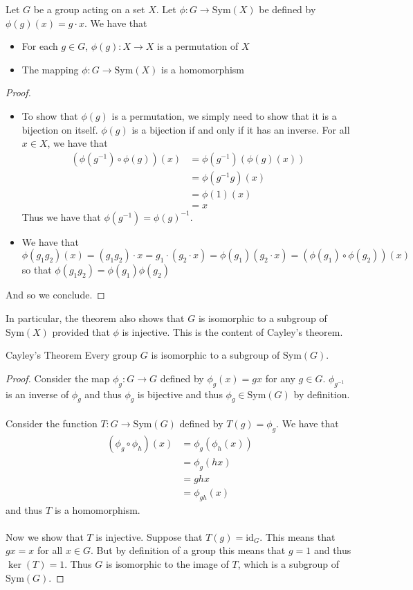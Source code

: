 \documentclass[a4paper]{article}
\begin{document}
\begin{prp}{}{} Let $G$ be a group acting on a set $X$. Let $\phi:G\to\text{Sym}(X)$ be defined by $\phi(g)(x)=g\cdot x$. We have that 
\begin{itemize}
\item For each $g\in G$, $\phi(g):X\to X$ is a permutation of $X$
\item The mapping $\phi:G\to\text{Sym}(X)$ is a homomorphism
\end{itemize}\tcbline
\begin{proof}~\\
\begin{itemize}
\item To show that $\phi(g)$ is a permutation, we simply need to show that it is a bijection on itself. $\phi(g)$ is a bijection if and only if it has an inverse. For all $x\in X$, we have that 
\begin{align*}
(\phi(g^{-1})\circ\phi(g))(x)&=\phi(g^{-1})(\phi(g)(x))\\
&=\phi(g^{-1}g)(x)\\
&=\phi(1)(x)\\
&=x
\end{align*} Thus we have that $\phi(g^{-1})=\phi(g)^{-1}$. 
\item We have that $$\phi(g_1g_2)(x)=(g_1g_2)\cdot x=g_1\cdot(g_2\cdot x)=\phi(g_1)(g_2\cdot x)=(\phi(g_1)\circ\phi(g_2))(x)$$ so that $\phi(g_1g_2)=\phi(g_1)\phi(g_2)$
\end{itemize}
And so we conclude. 
\end{proof}
\end{prp}

In particular, the theorem also shows that $G$ is isomorphic to a subgroup of $\text{Sym}(X)$ provided that $\phi$ is injective. This is the content of Cayley's theorem. 

\begin{thm}{Cayley's Theorem}{} Every group $G$ is isomorphic to a subgroup of $\text{Sym}(G)$. \tcbline
\begin{proof}
Consider the map $\phi_g:G\to G$ defined by $\phi_g(x)=gx$ for any $g\in G$. $\phi_{g^{-1}}$ is an inverse of $\phi_g$ and thus $\phi_g$ is bijective and thus $\phi_g\in\text{Sym}(G)$ by definition. \\~\\
Consider the function $T:G\to\text{Sym}(G)$ defined by $T(g)=\phi_g$. We have that 
\begin{align*}
(\phi_g\circ\phi_h)(x)&=\phi_g(\phi_h(x))\\
&=\phi_g(hx)\\
&=ghx\\
&=\phi_{gh}(x)
\end{align*}
and thus $T$ is a homomorphism. \\~\\
Now we show that $T$ is injective. Suppose that $T(g)=\text{id}_G$. This means that $gx=x$ for all $x\in G$. But by definition of a group this means that $g=1$ and thus $\ker(T)=1$. Thus $G$ is isomorphic to the image of $T$, which is a subgroup of $\text{Sym}(G)$. 
\end{proof}
\end{thm}
\end{document}
